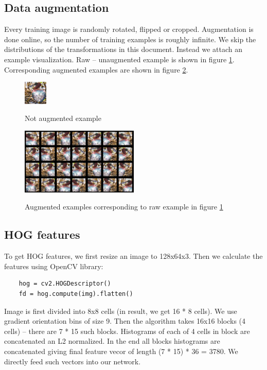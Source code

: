 \documentclass[a4paper]{article}
\begin{document}
\begin{multicols}{2}
\subsection{Data augmentation}
\label{augmentation}
Every training image is randomly rotated, flipped or cropped.
Augmentation is done online, so the number of training examples is
roughly infinite.
We skip the distributions of the transformations in this document.
Instead we attach an example visualization.
Raw -- unaugmented example is shown in figure \ref{fig:aug1}.
Corresponding augmented examples are shown in figure \ref{fig:aug2}.


\begin{figure}[H]
    \caption[]{Not augmented example}
    \centering
    \includegraphics[page=2,width=0.1\textwidth]{aug1.png}
    \label{fig:aug1}
\end{figure}

\begin{figure}[H]
    \caption[]{Augmented examples corresponding to raw example in figure \ref{fig:aug1}}
    \centering
    \includegraphics[page=2,width=0.5\textwidth]{aug2.png}
    \label{fig:aug2}
\end{figure}

\subsection{HOG features}
To get HOG features, we first resize an image to 128x64x3.
Then we calculate the features using OpenCV library:
\begin{verbatim}
    hog = cv2.HOGDescriptor()
    fd = hog.compute(img).flatten()
\end{verbatim}

Image is first divided into 8x8 cells (in result, we get 16 * 8 cells).
We use gradient orientation bins of size 9.
Then the algorithm takes 16x16 blocks (4 cells) --
there are 7 * 15 such blocks.
Histograms of each of 4 cells in block are concatenated an L2 normalized.
In the end all blocks histograms are concatenated giving
final feature vecor of length (7 * 15) * 36 = 3780.
We directly feed such vectors into our network.


\end{multicols}
\end{document}
